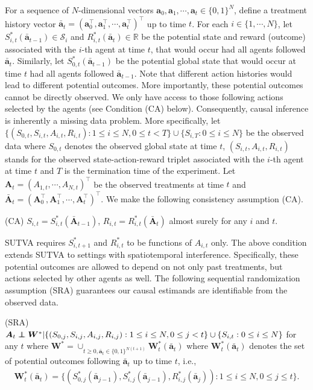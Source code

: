 \documentclass{article}
\newcommand\independent{\protect\mathpalette{\protect\independenT}{\perp}}
\def\independenT#1#2{\mathrel{\rlap{$#1#2$}\mkern2mu{#1#2}}}
\begin{document}
For a sequence of $N$-dimensional vectors $\bm{a}_0,\bm{a}_1,\cdots, \bm{a}_t\in \{0,1\}^{N}$, define a treatment history vector $\bar{\bm{a}}_t=(\bm{a}_0^\top,\bm{a}_1^\top,\cdots,\bm{a}_t^\top)^\top$ up to time $t$. For each $i\in \{1,\cdots,N\}$, let $S_{i,t}^*(\bar{\bm{a}}_{t-1}) \in \mathcal{S}_i$ and $R_{i,t}^*(\bar{\bm{a}}_t)\in \mathbb{R}$ be the potential state and reward (outcome) associated with the $i$-th agent at time $t$, that would occur had all agents followed $\bar{\bm{a}}_t$. Similarly, let $S_{0,t}^*(\bar{\bm{a}}_{t-1})$ be the potential global state that would occur at time $t$ had all agents followed $\bar{\bm{a}}_{t-1}$. Note that different action histories would lead to different potential outcomes. More importantly, these potential outcomes cannot be directly observed. We only have access to those following actions selected by the agents (see Condition (CA) below). Consequently, causal inference is inherently a missing data problem. More specifically, let $\{(S_{0,t}, S_{i,t},A_{i,t},R_{i,t}):1\le i\le N,0\le t< T\}\cup \{S_{i,T}:0\le i\le N\}$ be the observed data where $S_{0,t}$ denotes the observed global state at time $t$, $(S_{i,t},A_{i,t},R_{i,t})$ stands for the observed state-action-reward triplet associated with the $i$-th agent at time $t$ and $T$ is the termination time of the experiment. 
Let $\bm{A}_t=(A_{1,t},\cdots,A_{N,t})^\top$ be the observed treatments at time $t$ and $\bar{\bm{A}}_t=(\bm{A}_0^\top,\bm{A}_1^\top,\cdots,\bm{A}_t^\top)^\top$. We make the following consistency assumption (CA).

(CA) $S_{i,t}=S_{i,t}^*(\bar{\bm{A}}_{t-1})$, $R_{i,t}=R_{i,t}^*(\bar{\bm{A}}_t)$ almost surely for any $i$ and $t$.

SUTVA requires $S_{i,t+1}^*$ and $R_{i,t}^*$ to be functions of $A_{i,t}$ only. The above condition extends SUTVA to settings with spatiotemporal interference. Specifically, these potential outcomes are allowed to depend on not only past treatments, but actions selected by other agents as well. The following sequential randomization assumption (SRA) guarantees our causal estimands are identifiable from the observed data. 

(SRA) $\bm{A}_t \independent \bm{W}^* |\{(S_{0,j},S_{i,j},A_{i,j},R_{i,j}): 1\le i\le N, 0\le j<t \}\cup \{S_{i,t}:0\le i\le N\}$ for any $t$ where $\bm{W}^*=\cup_{t\ge 0,\bar{\bm{a}}_t\in \{0,1\}^{N(t+1)} } \bm{W}_t^*(\bar{\bm{a}}_t)$ where $\bm{W}_t^*(\bar{\bm{a}}_t)$ denotes the set of potential outcomes following $\bar{\bm{a}}_t$ up to time $t$, i.e.,
\vspace*{-0.1cm}
\begin{eqnarray*}
	\bm{W}_t^*(\bar{\bm{a}}_t)=\{ (S_{0,j}^*(\bar{\bm{a}}_{j-1}), S_{i,j}^*(\bar{\bm{a}}_{j-1}), R_{i,j}^*(\bar{\bm{a}}_j)):1\le i\le N, 0\le j\le t \}.
\end{eqnarray*}
\end{document}
